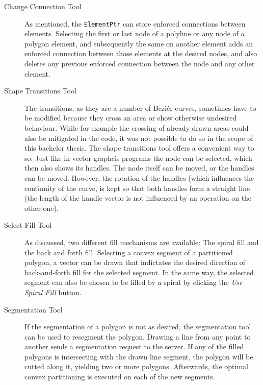 \begin{description}
\item[Change Connection Tool] As mentioned, the \texttt{ElementPtr} can store enforced connections between elements. Selecting the first or last node of a polyline or any node of a polygon element, and subsequently the same on another element adds an enforced connection between those elements at the desired nodes, and also deletes any previous enforced connection between the node and any other element.
\item[Shape Transitions Tool] The transitions, as they are a number of Beziér curves, sometimes have to be modified because they cross an area or show otherwise undesired behaviour. While for example the crossing of already drawn areas could also be mitigated in the code, it was not possible to do so in the scope of this bachelor thesis. The shape transitions tool offers a convenient way to so: Just like in vector graphcis programs the node can be selected, which then also shows its handles. The node itself can be moved, or the handles can be moved. However, the rotation of the handles (which influences the continuity of the curve, is kept so that both handles form a straight line (the length of the handle vector is not influenced by an operation on the other one).
\item[Select Fill Tool] As discussed, two different fill mechanisms are available: The spiral fill and the back and forth fill. Selecting a convex segment of a partitioned polygon, a vector can be drawn that indictates the desired direction of back-and-forth fill for the selected segment. In the same way, the selected segment can also be chosen to be filled by a spiral by clicking the \textit{Use Spiral Fill} button.
\item[Segmentation Tool] If the segmentation of a polygon is not as desired, the segmentation tool can be used to resegment the polygon. Drawing a line from any point to another sends a segmentation request to the server. If any of the filled polygons is intersecting with the drawn line segment, the polygon will be cutted along it, yielding two or more polygons. Afterwards, the optimal convex partitioning is executed on each of the new segments.
\end{description} 
